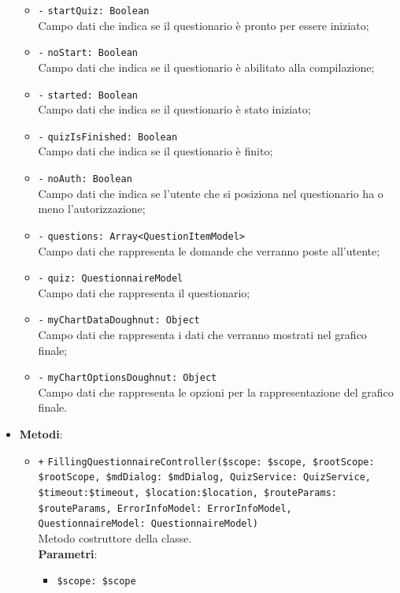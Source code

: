 \begin{itemize}
\begin{itemize}
		\item \texttt{-} \texttt{startQuiz: Boolean} \\ Campo dati che indica se il questionario è pronto per essere iniziato;
		\item \texttt{-} \texttt{noStart: Boolean} \\ Campo dati che indica se il questionario è abilitato alla compilazione;
		\item \texttt{-} \texttt{started: Boolean} \\ Campo dati che indica se il questionario è stato iniziato;
		\item \texttt{-} \texttt{quizIsFinished: Boolean} \\ Campo dati che indica se il questionario è finito;
		\item \texttt{-} \texttt{noAuth: Boolean} \\ Campo dati che indica se l'utente che si posiziona nel questionario ha o meno l'autorizzazione;
		\item \texttt{-} \texttt{questions: Array<QuestionItemModel>} \\ Campo dati che rappresenta le domande che verranno poste all'utente;
		\item \texttt{-} \texttt{quiz: QuestionnaireModel} \\ Campo dati che rappresenta il questionario;
		\item \texttt{-} \texttt{myChartDataDoughnut: Object} \\ Campo dati che rappresenta i dati che verranno mostrati nel grafico finale;
		\item \texttt{-} \texttt{myChartOptionsDoughnut: Object} \\ Campo dati che rappresenta le opzioni per la rappresentazione del grafico finale.
	\end{itemize}
	\item \textbf{Metodi}:
	\begin{itemize}
		\item \texttt{+} \texttt{FillingQuestionnaireController(\$scope: \$scope, \$rootScope: \$rootScope, \$mdDialog: \$mdDialog, QuizService: QuizService, \$timeout:\$timeout, \$location:\$location, \$routeParams: \$routeParams, ErrorInfoModel: ErrorInfoModel, QuestionnaireModel: QuestionnaireModel)} \\Metodo costruttore della classe.\\
		\textbf{Parametri}:
		\begin{itemize}
			\item \texttt{\$scope: \$scope} \\

\end{itemize}
\end{itemize}
\end{itemize}
